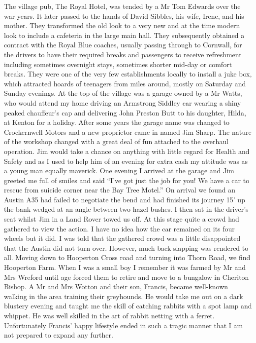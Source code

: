 The village pub, The Royal Hotel, was tended by a Mr Tom Edwards over the war
years. It later passed to the hands of David Sibbles, his wife, Irene, and his
mother. They transformed the old look to a very new and at the time modern look
to include a cafeteria in the large main hall. They subsequently obtained a
contract with the Royal Blue coaches, usually passing through to Cornwall, for
the drivers to have their required breaks and passengers to receive refreshment
including sometimes overnight stays, sometimes shorter mid-day or comfort
breaks. They were one of the very few establishments locally to install a juke
box, which attracted hoards of teenagers from miles around, mostly on Saturday
and Sunday evenings. At the top of the village was a garage owned by a Mr
Watts, who would attend my home driving an Armstrong Siddley car wearing a
shiny peaked chauffeur's cap and delivering John Preston Butt to his daughter,
Hilda, at Kenton for a holiday. After some years the garage name was changed to
Crockernwell Motors and a new proprietor came in named Jim Sharp. The nature of
the workshop changed with a great deal of fun attached to the overhaul
operation. Jim would take a chance on anything with little regard for Health
and Safety and as I used to help him of an evening for extra cash my attitude
was as a young man equally maverick. One evening I arrived at the garage and
Jim greeted me full of smiles and said ``I've got just the job for you! We
have a car to rescue from suicide corner near the Bay Tree Motel.'' On arrival
we found an Austin A35 had failed to negotiate the bend and had finished its
journey 15' up the bank wedged at an angle between two hazel bushes. I then sat
in the driver's seat whilst Jim in a Land Rover towed us off. At this stage
quite a crowd had gathered to view the action. I have no idea how the car
remained on its four wheels but it did. I was told that the gathered crowd was
a little disappointed that the Austin did not turn over. However, much back
slapping was rendered to all. Moving down to Hooperton Cross road and turning
into Thorn Road, we find Hooperton Farm. When I was a small boy I remember it
was farmed by Mr and Mrs Wreford until age forced them to retire and move to a
bungalow in Cheriton Bishop. A Mr and Mrs Wotton and their son, Francis, became
well-known walking in the area training their greyhounds. He would take me out
on a dark blustery evening and taught me the skill of catching rabbits with a
spot lamp and whippet. He was well skilled in the art of rabbit netting with a
ferret. Unfortunately Francis' happy lifestyle ended in such a tragic manner
that I am not prepared to expand any further.

